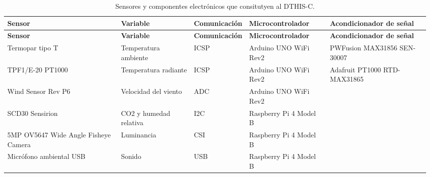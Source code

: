 \documentclass[
  letterpaper,
]{scrbook}
\begin{document}
\begin{longtable}[]{@{}
  >{\raggedright\arraybackslash}p{}
  >{\raggedright\arraybackslash}p{}
  >{\raggedright\arraybackslash}p{}
  >{\raggedright\arraybackslash}p{}
  >{\raggedright\arraybackslash}p{}@{}}
\caption{Sensores y componentes electrónicos que consitutyen al
DTHIS-C.}\label{tbl-componentes}\tabularnewline
\toprule\noalign{}
\begin{minipage}[b]{\linewidth}\raggedright
\textbf{Sensor}
\end{minipage} & \begin{minipage}[b]{\linewidth}\raggedright
\textbf{Variable}
\end{minipage} & \begin{minipage}[b]{\linewidth}\raggedright
\textbf{Comunicación}
\end{minipage} & \begin{minipage}[b]{\linewidth}\raggedright
\textbf{Microcontrolador}
\end{minipage} & \begin{minipage}[b]{\linewidth}\raggedright
\textbf{Acondicionador de señal}
\end{minipage} \\
\midrule\noalign{}
\endfirsthead
\toprule\noalign{}
\begin{minipage}[b]{\linewidth}\raggedright
\textbf{Sensor}
\end{minipage} & \begin{minipage}[b]{\linewidth}\raggedright
\textbf{Variable}
\end{minipage} & \begin{minipage}[b]{\linewidth}\raggedright
\textbf{Comunicación}
\end{minipage} & \begin{minipage}[b]{\linewidth}\raggedright
\textbf{Microcontrolador}
\end{minipage} & \begin{minipage}[b]{\linewidth}\raggedright
\textbf{Acondicionador de señal}
\end{minipage} \\
\midrule\noalign{}
\endhead
\bottomrule\noalign{}
\endlastfoot
Termopar tipo T & Temperatura ambiente & ICSP & Arduino UNO WiFi Rev2 &
PWFusion MAX31856 SEN-30007 \\
TPF1/E-20 PT1000 & Temperatura radiante & ICSP & Arduino UNO WiFi Rev2 &
Adafruit PT1000 RTD-MAX31865 \\
Wind Sensor Rev P6 & Velocidad del viento & ADC & Arduino UNO WiFi Rev2
& \\
SCD30 Sensirion & CO2 y humedad relativa & I2C & Raspberry Pi 4 Model B
& \\
5MP OV5647 Wide Angle Fisheye Camera & Luminancia & CSI & Raspberry Pi 4
Model B & \\
Micrófono ambiental USB & Sonido & USB & Raspberry Pi 4 Model B & \\
\end{longtable}
\end{document}
